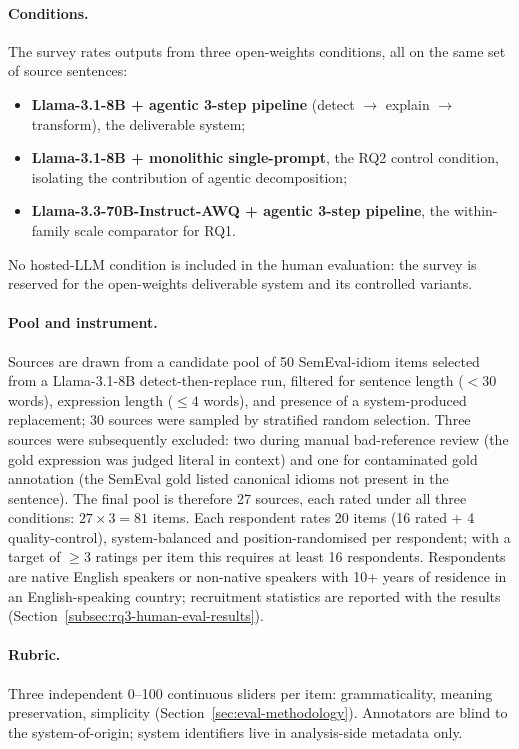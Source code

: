 \paragraph{Conditions.} The survey rates outputs from three open-weights conditions, all on the same set of source sentences:
\begin{itemize}
    \item \textbf{Llama-3.1-8B + agentic 3-step pipeline} (detect $\to$ explain $\to$ transform), the deliverable system;
    \item \textbf{Llama-3.1-8B + monolithic single-prompt}, the RQ2 control condition, isolating the contribution of agentic decomposition;
    \item \textbf{Llama-3.3-70B-Instruct-AWQ + agentic 3-step pipeline}, the within-family scale comparator for RQ1.
\end{itemize}
No hosted-LLM condition is included in the human evaluation: the survey is reserved for the open-weights deliverable system and its controlled variants.

\paragraph{Pool and instrument.} Sources are drawn from a candidate pool of 50 SemEval-idiom items selected from a Llama-3.1-8B detect-then-replace run, filtered for sentence length ($<30$ words), expression length ($\leq 4$ words), and presence of a system-produced replacement; 30 sources were sampled by stratified random selection. Three sources were subsequently excluded: two during manual bad-reference review (the gold expression was judged literal in context) and one for contaminated gold annotation (the SemEval gold listed canonical idioms not present in the sentence). The final pool is therefore 27 sources, each rated under all three conditions: $27 \times 3 = 81$ items. Each respondent rates 20 items (16 rated + 4 quality-control), system-balanced and position-randomised per respondent; with a target of $\geq 3$ ratings per item this requires at least 16 respondents. Respondents are native English speakers or non-native speakers with 10+ years of residence in an English-speaking country; recruitment statistics are reported with the results (Section~\ref{subsec:rq3-human-eval-results}).

\paragraph{Rubric.} Three independent 0--100 continuous sliders per item: grammaticality, meaning preservation, simplicity (Section~\ref{sec:eval-methodology}). Annotators are blind to the system-of-origin; system identifiers live in analysis-side metadata only.

